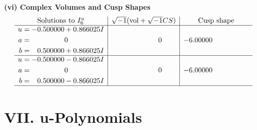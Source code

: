 \documentclass[1p]{elsarticle_modified}
\theoremstyle{definition}
\newcommand{\I}{\sqrt{-1}}
\begin{document}
\newpage\flushleft \textbf{(vi) Complex Volumes and Cusp Shapes}
$$\begin{array}{c|c|c}  
\text{Solutions to }I^u_{6}& \I (\text{vol} + \sqrt{-1}CS) & \text{Cusp shape}\\
 \hline 
\begin{aligned}
u &= -0.500000 + 0.866025 I \\
a &= \phantom{-0.000000 } 0 \\
b &= \phantom{-}0.500000 + 0.866025 I\end{aligned}
 & \phantom{-0.000000 } 0 & -6.00000\phantom{ +0.000000I} \\ \hline\begin{aligned}
u &= -0.500000 - 0.866025 I \\
a &= \phantom{-0.000000 } 0 \\
b &= \phantom{-}0.500000 - 0.866025 I\end{aligned}
 & \phantom{-0.000000 } 0 & -6.00000\phantom{ +0.000000I}\\
 \hline 
 \end{array}$$\newpage
\newpage\renewcommand{\arraystretch}{1}
\centering \section*{ VII. u-Polynomials}
\end{document}
